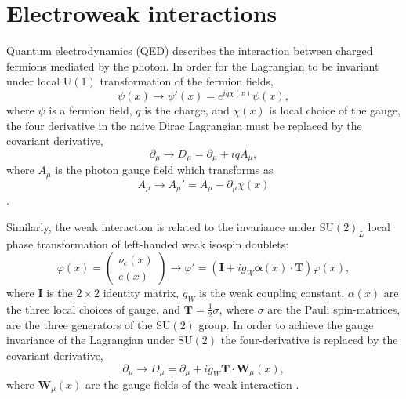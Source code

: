 \section{Electroweak interactions}

Quantum electrodynamics (QED) describes the interaction between charged fermions
mediated by the photon. In order for the Lagrangian to be invariant
under local $\text{U}(1)$ transformation of the fermion fields,
\begin{equation}
\psi(x) \rightarrow \psi'(x) = e^{iq\chi(x)}\psi(x),
\end{equation}
where $\psi$ is a fermion field, $q$ is the charge, and $\chi(x)$ is local choice of
the gauge, the four derivative in the naive Dirac Lagrangian must be replaced by
the covariant derivative,
\begin{equation}
\partial_\mu \rightarrow D_\mu = \partial_\mu + i q A_\mu,
\end{equation}
where $A_\mu$ is the photon gauge field which transforms as
\begin{equation}
A_\mu \rightarrow A_\mu' = A_\mu - \partial_\mu \chi(x)
\end{equation}
\cite{Thomson:2013zua}.

Similarly, the weak interaction is related to the invariance under $\text{SU}(2)_L$ local
phase transformation of left-handed weak isospin doublets:
\begin{equation}
\varphi(x) = \begin{pmatrix} \nu_e(x) \\ e(x) \end{pmatrix} \rightarrow
\varphi' = (\mathbf{I} + i g_W \mathbf{\alpha}(x)\cdot\mathbf{T}) \varphi(x),
\end{equation}
where $\mathbf{I}$ is the $2\times2$ identity matrix, $g_W$ is the weak coupling constant,
$\alpha(x)$ are the three local choices of gauge, and $\mathbf{T} = \frac{1}{2}\sigma$,
where $\sigma$ are the Pauli spin-matrices, are the three generators of the $\text{SU}(2)$ group.
In order to achieve the gauge invariance of the Lagrangian under $\text{SU}(2)$ the four-derivative
is replaced by the covariant derivative,
\begin{equation}
\partial_\mu \rightarrow D_\mu = \partial_\mu + i g_W \mathbf{T} \cdot \mathbf{W}_\mu(x),
\end{equation}
where $\mathbf{W}_\mu(x)$ are the gauge fields of the weak interaction \cite{Thomson:2013zua}.

